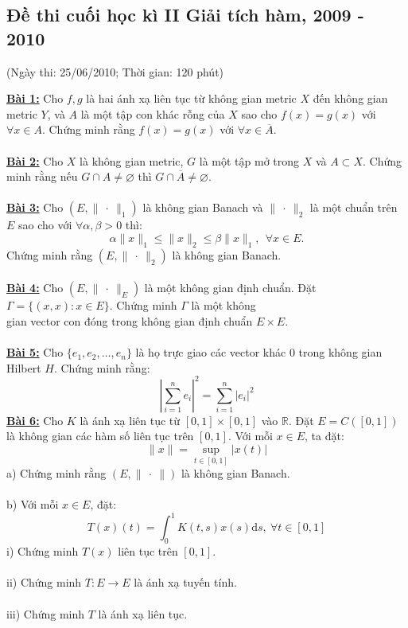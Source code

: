 \documentclass[10pt, a4paper]{article}
\begin{document}
\subsection{Đề thi cuối học kì II Giải tích hàm, 2009 - 2010}
\begin{center}
	\color{blue}(Ngày thi: 25/06/2010; Thời gian: 120 phút)
\end{center}
\color{red}\underline{\textbf{Bài 1:}} \color{black}Cho $f,g$ là hai ánh xạ liên tục từ không gian metric $X$ đến không gian metric $Y$, và $A$ là một tập con khác rỗng của $X$ sao cho $f(x)=g(x)$ với $\forall x\in A$. Chứng minh rằng $f(x)=g(x)$ với $\forall x\in\overline A$.\\\\
\color{red}\underline{\textbf{Bài 2:}} \color{black}Cho $X$ là không gian metric, $G$ là một tập mở trong $X$ và $A\subset X$. Chứng minh rằng nếu $G\cap A\ne\varnothing$ thì $G\cap\overline A\ne\varnothing$.\\\\
\color{red}\underline{\textbf{Bài 3:}} \color{black}Cho $(E,\lVert~\cdot~\rVert_1)$ là không gian Banach và $\lVert~\cdot~\rVert_2$ là một chuẩn trên $E$ sao cho với $\forall\alpha,\beta>0$ thì: $$\alpha\lVert x\rVert_1\le\lVert x\rVert_2\le\beta\lVert x\rVert_1,~~\forall x\in E.$$
Chứng minh rằng $(E,\lVert~\cdot~\rVert_2)$ là không gian Banach.\\\\
\color{red}\underline{\textbf{Bài 4:}} \color{black}Cho $(E,\lVert~\cdot~\rVert_E)$ là một không gian định chuẩn. Đặt $\Gamma=\{(x,x):x\in E\}$. Chứng minh $\Gamma$ là một không\\ gian vector con đóng trong không gian định chuẩn $E\times E$.\\\\
\color{red}\underline{\textbf{Bài 5:}} \color{black}Cho $\{e_1,e_2,\dots,e_n\}$ là họ trực giao các vector khác 0 trong không gian Hilbert $H$. Chứng minh rằng: $$\left|\displaystyle\sum_{i=1}^ne_i\right|^2=\displaystyle\sum_{i=1}^n|e_i|^2$$
\color{red}\underline{\textbf{Bài 6:}} \color{black}Cho $K$ là ánh xạ liên tục từ $[0,1]\times[0,1]$ vào $\mathbb R$. Đặt $E=C([0,1])$ là không gian các hàm số liên tục trên $[0,1]$. Với mỗi $x\in E$, ta đặt: $$\lVert x\rVert=\displaystyle\sup_{t\in[0,1]}|x(t)|$$
\color{red}a) \color{black}Chứng minh rằng $(E,\lVert~\cdot~\rVert)$ là không gian Banach.\\\\
\color{red}b) \color{black}Với mỗi $x\in E$, đặt: $$T(x)(t)=\displaystyle\int_0^1K(t,s)x(s)\text{d}s,~\forall t\in[0,1]$$
\text{~~~~~~}\color{red}i) \color{black}Chứng minh $T(x)$ liên tục trên $[0,1]$.\\\\
\text{~~~~~~}\color{red}ii) \color{black}Chứng minh $T:E\rightarrow E$ là ánh xạ tuyến tính.\\\\
\text{~~~~~~}\color{red}iii) \color{black}Chứng minh $T$ là ánh xạ liên tục.
\end{document}
